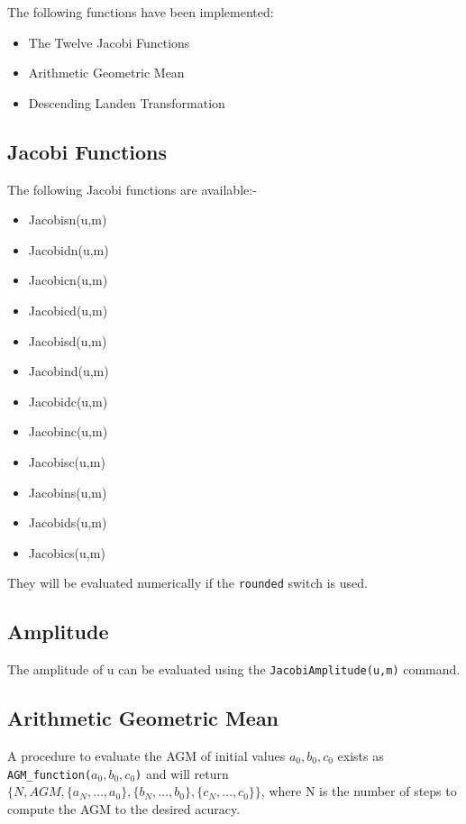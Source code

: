 The following functions have been implemented:

\begin{itemize}
\item The Twelve Jacobi Functions
\item Arithmetic Geometric Mean
\item Descending Landen Transformation
\end{itemize}

\subsection{Jacobi Functions}

The following Jacobi functions are available:-

\begin{itemize}
\item Jacobisn(u,m)
\item Jacobidn(u,m)
\item Jacobicn(u,m)
\item Jacobicd(u,m)
\item Jacobisd(u,m)
\item Jacobind(u,m)
\item Jacobidc(u,m)
\item Jacobinc(u,m)
\item Jacobisc(u,m)
\item Jacobins(u,m)
\item Jacobids(u,m)
\item Jacobics(u,m)
\end{itemize}

They will be evaluated numerically if the {\tt rounded} switch is used.

\subsection{Amplitude}

The amplitude of u can be evaluated using the 
{\tt JacobiAmplitude(u,m)} command.

\subsection{Arithmetic Geometric Mean}

A procedure to evaluate the AGM of initial values \(a_0,b_0,c_0\) 
exists as \\
{\tt AGM\_function(\(a_0,b_0,c_0\))} and will return \\
$\{ N, AGM, \{ a_N, \ldots ,a_0\}, \{ b_N, \ldots ,b_0\}, 
\{c_N, \ldots ,c_0\}\}$, 
where N is the number of steps to compute the AGM to the 
desired acuracy. \\

